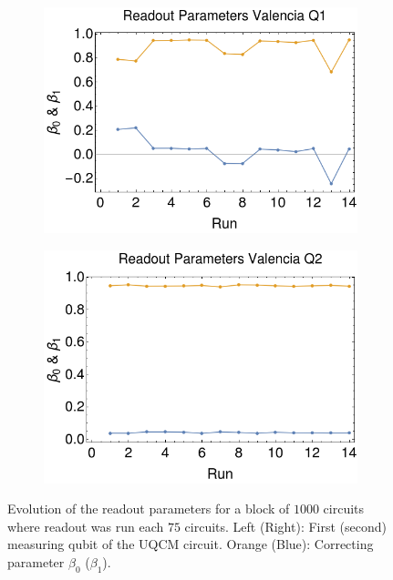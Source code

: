 \begin{figure}[H]
    \centering
    \begin{subfigure}{.5\textwidth}
      \centering
      \includegraphics[width=\textwidth]{Figures/Calibrations/readout_vigo_q1.png}
    \end{subfigure}%
    \begin{subfigure}{.5\textwidth}
      \centering
      \includegraphics[width=\textwidth]{Figures/Calibrations/readout_vigo_q2.png}
    \end{subfigure}
    \caption{Evolution of the readout parameters for a block of $1000$ circuits where readout was run each $75$ circuits. Left (Right): First (second) measuring qubit of the UQCM circuit. Orange (Blue): Correcting parameter $\beta_0$ ($\beta_1$).}
    \label{fig:readout_time}
\end{figure}

